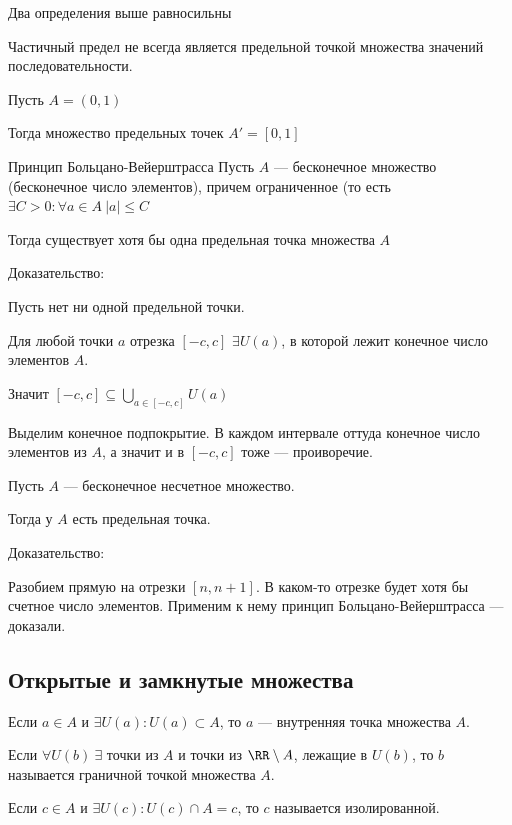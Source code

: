 \begin{exercise}{}{}
    Два определения выше равносильны
\end{exercise}

Частичный предел не всегда является предельной точкой множества значений последовательности.

\begin{example}{}{}
    Пусть \( A = (0, 1) \)

    Тогда множество предельных точек \( A' = [0, 1] \)
\end{example}

\begin{thrm}{Принцип Больцано-Вейерштрасса}{}
    Пусть \( A \) --- бесконечное множество (бесконечное число элементов),
    причем ограниченное (то есть \( \exists C > 0 : \forall a \in A \ |a| \leq C \)

    Тогда существует хотя бы одна предельная точка множества \( A \)
\end{thrm}

Доказательство:

Пусть нет ни одной предельной точки.

Для любой точки \( a \) отрезка \( [-c, c] \) \( \exists U(a) \), 
в которой лежит конечное число элементов \( A \).

Значит \( \displaystyle [-c, c] \subseteq \bigcup\limits_{a \in [-c, c]} U(a) \)

Выделим конечное подпокрытие.
В каждом интервале оттуда конечное число элементов из \( A \), а значит и в \( [-c, c] \) тоже --- проиворечие.

\begin{prop}{}{}
    Пусть \( A \) --- бесконечное несчетное множество.

    Тогда у \( A \) есть предельная точка.
\end{prop}

Доказательство:

Разобием прямую на отрезки \( [n, n + 1] \).
В каком-то отрезке будет хотя бы счетное число элементов.
Применим к нему принцип Больцано-Вейерштрасса --- доказали.

\subsection{Открытые и замкнутые множества}

\begin{defn}{}{}
    Если \( a \in A \) и \( \exists U(a) : U(a) \subset A \), то \( a \) --- внутренняя точка множества \( A \).

    Если \( \forall U(b) \ \exists \) точки из \( A \) и точки из \( \RR \setminus A \),
    лежащие в \( U(b) \), то \( b \) называется граничной точкой множества \( A \).

    Если \( c \in A \) и \( \exists U(c) : U(c) \cap A = c \), то \( c \) называется изолированной.
\end{defn}

